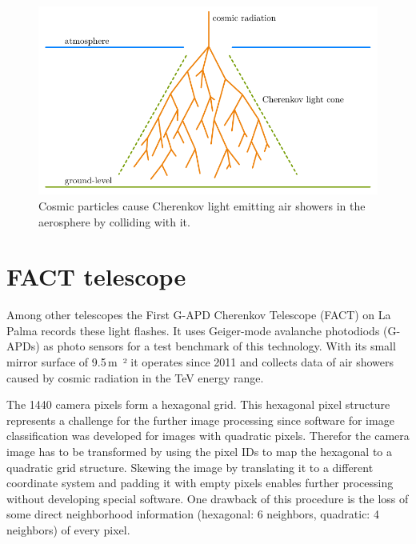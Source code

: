 \begin{figure}
    \centering
    \includegraphics[scale=1]{Plots/Air_Shower.pdf}
    \caption{Cosmic particles cause Cherenkov light emitting air showers in the aerosphere by colliding with it.}
    \label{fig:air_shower}
\end{figure}


\section{FACT telescope}
Among other telescopes the First G-APD Cherenkov Telescope (FACT) on La Palma records these light flashes.
It uses Geiger-mode avalanche photodiods (G-APDs) as photo sensors for a test benchmark of this technology.
With its small mirror surface of \num{9.5}\,\si{\meter²} it operates since \num{2011}
and collects data of air showers caused by cosmic radiation in the TeV energy range.

The \num{1440} camera pixels form a hexagonal grid.
This hexagonal pixel structure represents a challenge for the further image processing
since software for image classification was developed for images with quadratic pixels.
Therefor the camera image has to be transformed by using the pixel IDs to map the hexagonal to a quadratic grid structure.
Skewing the image by translating it to a different coordinate system and padding it with empty pixels
enables further processing without developing special software.
One drawback of this procedure is the loss of some direct neighborhood information
(hexagonal: \num{6} neighbors, quadratic: \num{4} neighbors) of every pixel.


